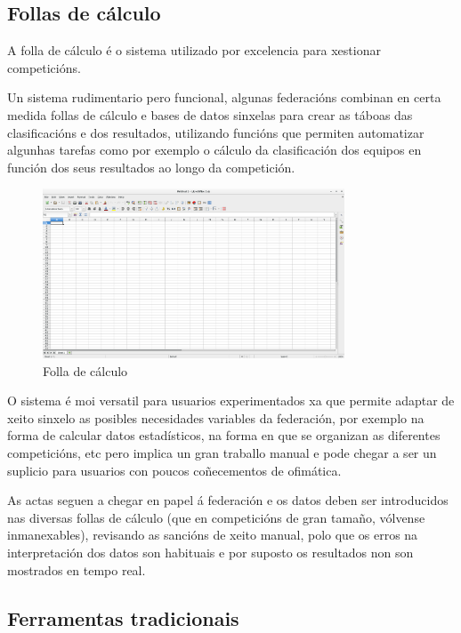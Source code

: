     \subsection{Follas de cálculo}
    A folla de cálculo é o sistema utilizado por excelencia para 
xestionar competicións.

    Un sistema rudimentario pero funcional, algunas federacións combinan en certa medida 
follas de cálculo e bases de datos sinxelas para crear as táboas das 
clasificacións e dos resultados, utilizando funcións que permiten automatizar algunhas 
tarefas como por exemplo o cálculo da clasificación dos equipos en función dos 
seus resultados ao longo da competición.

    \begin{figure}[h!]
	  \begin{center}
	    \includegraphics[width=0.8\textwidth]{./img/calculo.png}
	    \caption{Folla de cálculo}
	    \label{fig:img:calculo}
	  \end{center}
    \end{figure}

    O sistema é moi versatil para usuarios experimentados xa que permite adaptar 
de xeito sinxelo as posibles necesidades variables da federación, por exemplo 
na forma de calcular datos estadísticos, na forma en que se organizan as 
diferentes competicións, etc pero implica un gran traballo manual e pode chegar 
a ser un suplicio para usuarios con poucos coñecementos de ofimática.

  As actas seguen a chegar en papel á federación e os datos deben ser 
introducidos nas diversas follas de cálculo (que en competicións de gran tamaño, 
vólvense inmanexables), revisando as sancións de xeito manual, polo que os erros 
na interpretación dos datos son habituais e por suposto os resultados non son 
mostrados en tempo real.

    \subsection{Ferramentas tradicionais}

